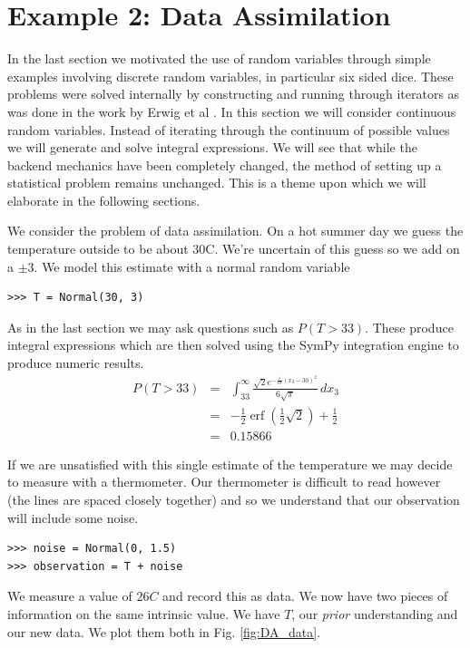 \section{Example 2: Data Assimilation}

In the last section we motivated the use of random variables through simple examples involving discrete random variables, in particular six sided dice. These problems were solved internally by constructing and running through iterators as was done in the work by Erwig et al \cite{Erwig2006}. In this section we will consider continuous random variables. Instead of iterating through the continuum of possible values we will generate and solve integral expressions. We will see that while the
backend mechanics have been completely changed, the method of setting up a statistical problem remains unchanged. This is a theme upon which we will elaborate in the following sections. 

We consider the problem of data assimilation. On a hot summer day we guess the temperature outside to be about 30C. We're uncertain of this guess so we add on a $\pm3$. We model this estimate with a normal random variable

\begin{lstlisting}
>>> T = Normal(30, 3)
\end{lstlisting}

As in the last section we may ask questions such as $P(T>33)$. These produce integral expressions which are then solved using the SymPy integration engine to produce numeric results.
\begin{eqnarray*}
P(T>33) & = & \int_{33}^{\infty} \frac{\sqrt{2} e^{- \frac{1}{18} \left(x_{3} -30\right)^{2}}}{6 \sqrt{\pi}}\, dx_{3} \\
& = & - \frac{1}{2} \operatorname{erf}{\left (\frac{1}{2} \sqrt{2} \right )} + \frac{1}{2} \\
& = & 0.15866
\end{eqnarray*}

If we are unsatisfied with this single estimate of the temperature we may decide to measure with a thermometer. Our thermometer is difficult to read however (the lines are spaced closely together) and so we understand that our observation will include some noise. 

\begin{lstlisting}
>>> noise = Normal(0, 1.5)
>>> observation = T + noise
\end{lstlisting}

We measure a value of $26C$ and record this as data. We now have two pieces of information on the same intrinsic value. We have $T$, our \textit{prior} understanding and our new data. We plot them both in Fig. \ref{fig:DA_data}. 


